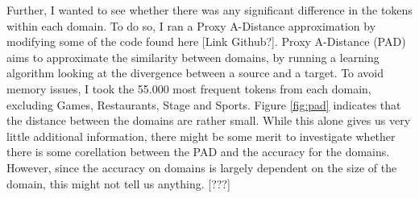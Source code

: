 Further, I wanted to see whether there was any significant difference in the tokens within each domain. To do so, I ran a Proxy A-Distance approximation \cite{ganin2016domainadversarial} by modifying some of the code found here [Link Github?]. Proxy A-Distance (PAD) aims to approximate the similarity between domains, by running a learning algorithm looking at the divergence between a source and a target. To avoid memory issues, I took the 55.000 most frequent tokens from each domain, excluding Games, Restaurants, Stage and Sports. Figure \ref{fig:pad} indicates that the distance between the domains are rather small. While this alone gives us very little additional information, there might be some merit to investigate whether there is some corellation between the PAD and the accuracy for the domains. However, since the accuracy on domains is largely dependent on the size of the domain, this might not tell us anything. [???]

